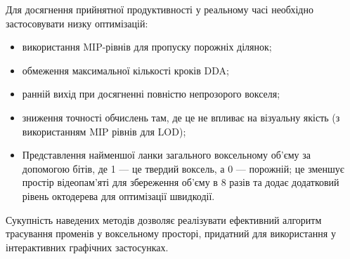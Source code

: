 Для досягнення прийнятної продуктивності у реальному часі необхідно застосовувати низку оптимізацій:
\begin{itemize}[itemsep=0pt, topsep=0pt, label=$\diamond$]
    \item використання MIP-рівнів для пропуску порожніх ділянок;
    \item обмеження максимальної кількості кроків DDA;
    \item ранній вихід при досягненні повністю непрозорого вокселя;
    \item зниження точності обчислень там, де це не впливає на візуальну якість (з використанням MIP рівнів для LOD);
    \item Представлення найменшої ланки загального воксельному об'єму за допомогою бітів, де 1 --- це твердий воксель, а 0 --- порожній; це зменшує простір відеопам'яті для збереження об'єму в 8 разів та додає додатковий рівень октодерева для оптимізації швидкодії.
\end{itemize}

Сукупність наведених методів дозволяє реалізувати ефективний алгоритм трасування променів у воксельному просторі, придатний для використання у інтерактивних графічних застосунках.